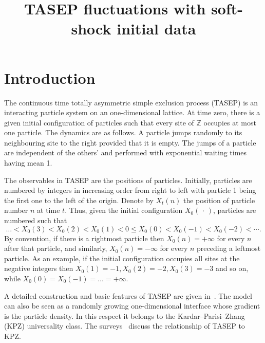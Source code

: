 \documentclass[AHL,Unicode,longabstracts]{cedram}
\title{TASEP fluctuations with soft-shock initial data}
\author{\firstname{Jeremy} \lastname{Quastel}}
\author{\firstname{Mustazee} \lastname{Rahman}}
\newcommand{\Z}{\mathbb{Z}}
\begin{document}
\maketitle

\section{Introduction}

The continuous time totally asymmetric simple exclusion process (TASEP) is an interacting particle system on an one-dimensional lattice. At time zero, there is a given initial configuration of particles such that every site of $\Z$ occupies at most one particle. The dynamics are as follows. A particle jumps randomly to its neighbouring site to the right provided that it is empty. The jumps of a particle are independent of the others' and performed with exponential waiting times having mean 1.

The observables in TASEP are the positions of particles. Initially, particles are numbered by integers in increasing order from right to left with particle 1 being the first one to the left of the origin. Denote by $X_t(n)$ the position of particle number $n$ at time $t$. Thus, given the initial configuration $X_0({\,\cdot\,})$, particles are numbered such that
\[
\dots < X_0(3) < X_0(2) < X_0(1) < 0 \leq X_0(0) < X_0(-1) < X_0(-2) < \cdots.
\]
By convention, if there is a rightmost particle then $X_0(n) = + \infty$ for every $n$ after that particle, and similarly, $X_0(n) = - \infty$ for every $n$ preceding a leftmost particle. As an example, if the initial configuration occupies all sites at the negative integers then $X_0(1) = -1, X_0(2) = -2, X_0(3) = -3$ and so on, while $X_0(0) = X_0(-1)= \dots = + \infty$.

A detailed construction and basic features of TASEP are given in~\cite{Lig}. The model can also be seen as a randomly growing one-dimensional interface whose gradient is the particle density. In this respect it belongs to the Kardar--Parisi--Zhang (KPZ) universality class. The surveys~\cite{BG, Q} discuss the relationship of TASEP to KPZ.
\end{document}

